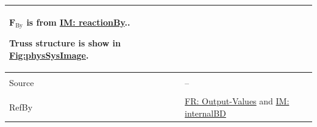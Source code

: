 \documentclass[12pt]{article}
\begin{document}
\begin{minipage}{\textwidth}
\begin{tabular}{>{\raggedright}p{}>{\raggedright\arraybackslash}p{}}
        ${\mathbf{F}_{\text{By}}}$ is from \hyperref[IM:reactionBy]{IM: reactionBy}..
        
        Truss structure is show in \hyperref[Figure:physSysImage]{Fig:physSysImage}.
        
\\ \midrule \\
Source & --
         
\\ \midrule \\
RefBy & \hyperref[outputValues]{FR: Output-Values} and \hyperref[IM:internalBD]{IM: internalBD}
        
\\ \bottomrule
\end{tabular}
\end{minipage}
\end{document}
